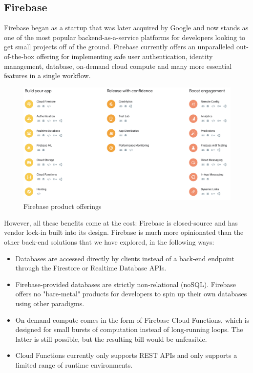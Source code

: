 \subsection{Firebase}
Firebase began as a startup that was later acquired by Google and now stands as one of the most popular backend-as-a-service platforms for developers looking to get small projects off of the ground. Firebase currently offers an unparalleled out-of-the-box offering for implementing safe user authentication, identity management, database, on-demand cloud compute and many more essential features in a single workflow.

\begin{figure}[h]
    \begin{center}
        \includegraphics[scale=0.3]{images/firebase_offerings.png}
    \end{center}
    \caption{Firebase product offerings}
    \label{firebase_compute_offerings}
\end{figure}

However, all these benefits come at the cost: Firebase is closed-source and has vendor lock-in built into its design. Firebase is much more opinionated than the other back-end solutions that we have explored, in the following ways:

\begin{itemize}
    \item Databases are accessed directly by clients instead of a back-end endpoint through the Firestore or Realtime Database APIs. 
    \item Firebase-provided databases are strictly non-relational (noSQL). Firebase offers no "bare-metal" products for developers to spin up their own databases using other paradigms.
    \item On-demand compute comes in the form of Firebase Cloud Functions, which is designed for small bursts of computation instead of long-running loops. The latter is still possible, but the resulting bill would be unfeasible.
    \item Cloud Functions currently only supports REST APIs and only supports a limited range of runtime environments.
\end{itemize}

